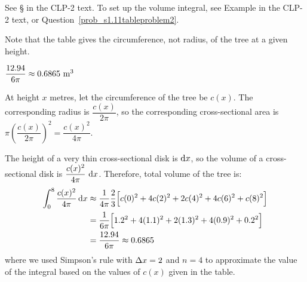 \begin{hint}
See \S{} in the
CLP-2 text.
To set up the volume integral, see Example  in the
CLP-2 text, or Question~\ref{prob_s1.11tableproblem2}.

Note that the table gives the circumference, not radius, of the tree at a given height.
\end{hint}

\begin{answer}
$\dfrac{12.94}{6\pi}
\approx0.6865\ {\rm m}^3$
\end{answer}

\begin{solution}
At height $x$ metres, let the circumference of the tree be $c(x)$.
The corresponding
radius is $\dfrac{c(x)}{2\pi}$, so the corresponding cross-sectional area
is $\pi\left(\dfrac{c(x)}{2\pi}\right)^2=\dfrac{c(x)^2}{4\pi}$.


\begin{center}
\end{center}

The height of a very thin cross-sectional  disk is $\mathrm{d}x$, so the
volume of a cross-sectional disk is $\dfrac{c(x)^2}{4\pi}~\mathrm{d}x$.
Therefore,
total volume of the tree is:
\begin{align*}
\int_0^8 \frac{c(x)^2}{4\pi}\,\mathrm{d}x
&\approx \frac{1}{4\pi}\frac{2}{3}\Big[c(0)^2+4c(2)^2+2c(4)^2+4c(6)^2+c(8)^2\Big]\cr
&=\frac{1}{6\pi}\Big[1.2^2+4(1.1)^2+2(1.3)^2+4(0.9)^2+0.2^2\Big]\\
&=\frac{12.94}{6\pi}
\approx0.6865
\end{align*}
where we used Simpson's rule with $\Delta x = 2$ and $n=4$ to approximate the value of the integral based on the values of $c(x)$ given in  the table.
\end{solution}

